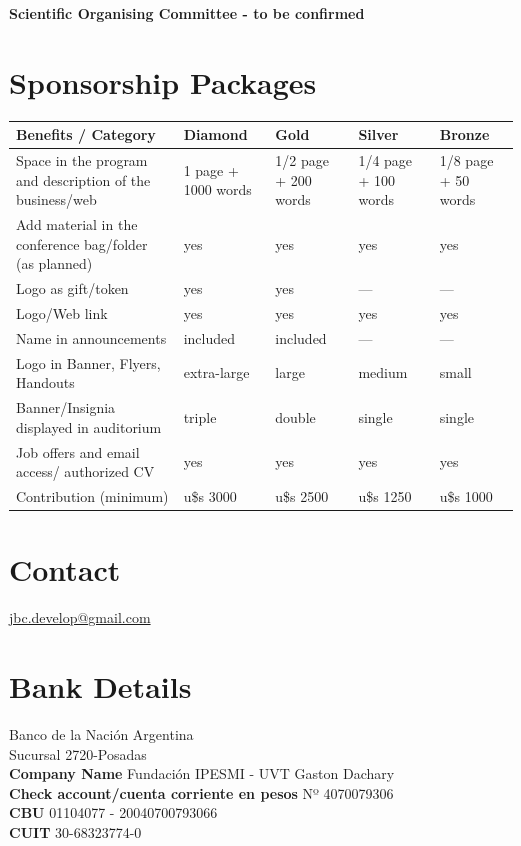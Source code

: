 \documentclass[11pt,a4paper]{report}
\begin{document}
\textbf{Scientific Organising Committee - to be confirmed}

\newpage
\section*{Sponsorship Packages}
\begin{center}

\begin{tabular}{|p{4cm}|p{2.5cm}|p{2.5cm}|p{2.5cm}|p{2.5cm}|}
\hline
Benefits / Category & Diamond & Gold  & Silver & Bronze \\
\hline
Space in the program and description of the business/web & 1 page +
1000 words & 1/2 page + 200 words & 1/4 page + 100 words &  1/8 page +
50 words\\
\hline
Add material in the conference bag/folder (as planned) & yes & yes & yes & yes \\
\hline
Logo as gift/token & yes & yes & --- & --- \\
\hline
Logo/Web link  & yes & yes & yes & yes \\
\hline
Name in announcements & included & included & --- & --- \\
\hline
Logo in Banner, Flyers, Handouts & extra-large & large & medium & small \\
\hline
Banner/Insignia displayed in auditorium & triple & double & single & single \\
\hline
Job offers and email access/ authorized CV  & yes & yes & yes & yes \\
\hline
Contribution (minimum) & u\$s 3000 & u\$s 2500 & u\$s 1250 & u\$s 1000\\
\hline
\end{tabular}
\end{center}

\section*{Contact}
\noindent \href{mailto:jbc.develop@gmail.com}{jbc.develop@gmail.com}

\section*{Bank Details}
\noindent Banco de la Nación Argentina \\
Sucursal 2720-Posadas \\
\textbf{Company Name} Fundación IPESMI - UVT Gaston Dachary \\
\textbf{Check account/cuenta corriente en pesos} Nº 4070079306 \\
\textbf{CBU} 01104077 - 20040700793066 \\
\textbf{CUIT} 30-68323774-0 \\
\end{document}
